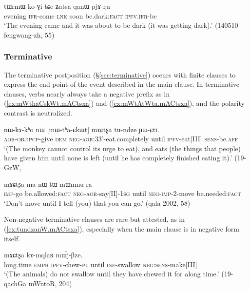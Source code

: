 \begin{exe}
\ex \label{ex:qanW.pjANu}
\gll  tɯrmɯ ko-ɣi tɕe ʑatsa qanɯ pjɤ-ŋu \\
evening \textsc{ifr}-come \textsc{lnk} soon be.dark:\textsc{fact} \textsc{ipfv}.\textsc{ifr}-be \\
\glt `The evening came and it was about to be dark (it was getting dark).' (140510 fengwang-zh, 55)
\end{exe}

 \subsubsection{Terminative} \label{sec:terminative.clause}
The terminative postposition    (§\ref{sec:terminative}) occurs with finite clauses to express the end point of the event described in the main clause. In terminative clauses, verbs nearly always take a negative prefix as in (\ref{ex:mWthaCskWt.mACtsxa}) and (\ref{ex:mWtAtWta.mACtsxa}), and the polarity contrast is neutralized.

\begin{exe}
\ex \label{ex:mWthaCskWt.mACtsxa}
\gll nɯ-kɤ-kʰo nɯ [mɯ-tʰa-ɕkɯt] mɤɕtʂa tu-ndze ɲɯ-ɕti. \\
\textsc{aor}-\textsc{obj}:\textsc{pcp}-give \textsc{dem} \textsc{neg}-\textsc{aor}:3\fl{}3'-eat.completely until \textsc{ipfv}-eat[III] \textsc{sens}-be.\textsc{aff} \\
\glt `(The monkey cannot control its urge to eat), and eats (the things that people) have given him until none is left (until he has completely finished eating it).' (19-GzW, 
\end{exe}

\begin{exe}
\ex \label{ex:mWtAtWta.mACtsxa}
 mɤɕtʂa ma-nɯ-tɯ-mɯnmu ra \\
\textsc{imp}-go be.allowed:\textsc{fact} \textsc{neg}-\textsc{aor}-say[II]-\textsc{1sg} until \textsc{neg}-\textsc{imp}-2-move be.needed:\textsc{fact} \\
\glt `Don't move until I tell (you) that you can go.' (qala 2002, 58)
\end{exe}

Non-negative terminative clauses are rare but attested, as in (\ref{ex:tundzanW.mACtsxa}), especially when the main clause is in negative form itself.

\begin{exe}
\ex \label{ex:tundzanW.mACtsxa}
 mɤɕtʂa kɤ-mqlaʁ mɯ́j-βze. \\
long.time \textsc{emph} \textsc{ipfv}-chew-\textsc{pl} until \textsc{inf}-swallow \textsc{neg}:\textsc{sens}-make[III] \\
\glt `(The animals) do not swallow until they have chewed it for along time.' (19-qachGa mWntoR, 204)
\end{exe}

